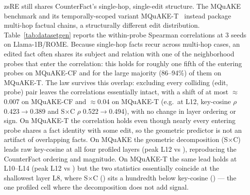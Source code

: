 zsRE still shares CounterFact's single-hop, single-edit structure. The MQuAKE
benchmark and its temporally-scoped variant
MQuAKE-T~\citep{zhong2023mquake} instead package multi-hop
factual chains, a structurally different edit distribution.
Table~\ref{tab:datasetgen} reports the within-probe Spearman correlations at 3
seeds on Llama-1B/ROME. Because single-hop facts recur across multi-hop cases,
an edited fact often shares its subject and relation with one of the
neighborhood probes that enter the correlation: this holds for
roughly one fifth of the entering probes on MQuAKE-CF and for the large
majority (86--94\%) of them on MQuAKE-T. The law survives this overlap:
excluding every colliding (edit, probe) pair leaves the correlations
essentially intact, with a shift of at most
$\approx$0.007 on MQuAKE-CF and
$\approx$0.04 on MQuAKE-T
(e.g.\ at L12, key-cosine $\rho$ 0.423$\to$0.389 and S$\times$C $\rho$
0.522$\to$0.494), with no change in layer ordering or sign. On MQuAKE-T the
correlation holds even though nearly every entering probe shares a fact identity
with some edit, so the geometric predictor is not an artifact of overlapping
facts. On MQuAKE the geometric
decomposition (S$\times$C) leads raw key-cosine at all four profiled layers
(peak L12 \mquakeSCpeak{} vs \mquakeCpeak{}), reproducing the CounterFact
ordering and magnitude. On MQuAKE-T the same lead holds at L10--L14
(peak L12 \mquaketSCpeak{} vs \mquaketCpeak{}) but the two statistics
essentially coincide at the shallowest layer L8, where S$\times$C
(\mquaketLeightSC{}) sits a hundredth below key-cosine (\mquaketLeightC{}) ---
the one profiled cell where the decomposition does not add signal.

